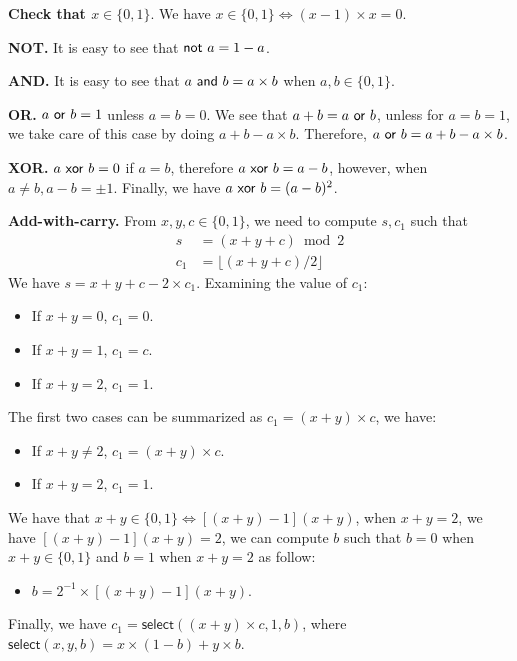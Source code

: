 \textbf{Check that $x \in \{0, 1\}$}. We have $x \in \{0, 1\} \iff (x - 1) \times x = 0$.

\textbf{NOT.} It is easy to see that $\mathsf{not\ } a = 1 - a$.

\textbf{AND.} It is easy to see that $a \mathsf{\ and\ } b = a \times b$ when $a, b \in \{0, 1\}$.

\textbf{OR.} $a \mathsf{\ or\ } b = 1$ unless $a = b = 0$. We see that $a + b = a \mathsf{\ or\ } b$, unless for $a = b = 1$, we take care of this case by doing $a + b - a \times b$. Therefore, $a \mathsf{\ or\ } b = a + b - a \times b$.

\textbf{XOR.} $a \mathsf{\ xor\ } b = 0$ if $a = b$, therefore $a \mathsf{\ xor\ } b = a - b$, however, when $a \ne b, a - b = \pm 1$. Finally, we have $a \mathsf{\ xor\ } b = (a - b)^2$.

\textbf{Add-with-carry.} From $x, y, c \in \{0, 1\}$, we need to compute $s, c_1$ such that
\begin{align*}
    s &= (x + y + c) \bmod 2 \\
    c_1 &= \lfloor (x + y + c) / 2 \rfloor
\end{align*}
We have $s = x + y + c - 2 \times c_1$. Examining the value of $c_1$:
\begin{itemize}
    \item If $x + y = 0$, $c_1 = 0$.
    \item If $x + y = 1$, $c_1 = c$.
    \item If $x + y = 2$, $c_1 = 1$.
\end{itemize}

The first two cases can be summarized as $c_1 = (x + y) \times c$, we have:
\begin{itemize}
    \item If $x + y \ne 2$, $c_1 = (x + y) \times c$.
    \item If $x + y = 2$, $c_1 = 1$.
\end{itemize}

We have that $x + y \in \{0, 1\} \iff [(x + y) - 1](x + y)$, when $x + y = 2$, we have $[(x + y) - 1](x + y) = 2$, we can compute $b$ such that $b = 0$ when $x + y \in \{0, 1\}$ and $b = 1$ when $x + y = 2$ as follow:
\begin{itemize}
    \item $b = 2^{-1} \times [(x + y) - 1](x + y)$.
\end{itemize}

Finally, we have $c_1 = \mathsf{select}((x + y) \times c, 1, b)$, where $\mathsf{select}(x, y, b) = x \times (1 - b) + y \times b$.

